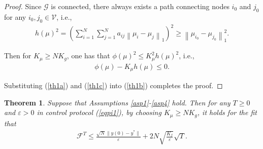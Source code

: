 \documentclass[letterpaper, 10 pt, conference]{ieeeconf}  %
\newtheorem{theorem}{ {Theorem}}
\begin{document}
\begin{proof}
	Since $\mathcal{G}$ is connected,  there always exists a path connecting nodes $i_0$ and $j_0$ for any $i_0,j_0\in\mathcal{V}$, i.e.,
	\begin{align}
		h(\mu)^2=\left(\sum_{i=1}^N\sum_{j=1}^Na_{ij}\left\|\mu_i-\mu_j\right\|_1\right)^2\ge \left\|\mu_{i_0}-\mu_{j_0}\right\|_1^2.
	\end{align}
	
	Then for $K_\mu \ge NK_g$, one has that
	$\phi(\mu)^2\le K_\mu^2 h(\mu)^2$,
	i.e.,
	\begin{align}
		\phi(\mu)-K_\mu h(\mu)\le 0.\label{th1c}
	\end{align}

	
	Substituting (\ref{th1a}) and (\ref{th1c}) into (\ref{th1b}) completes the proof.
	
\end{proof}

\begin{theorem}\label{th2}	
	Suppose that Assumptions \ref{asp1}-\ref{asp4} hold. Then for any $T\ge0$ and $\varepsilon>0$ in control protocol (\ref{eqpi1}), by choosing $K_\mu \ge NK_g$, it holds for the fit that
	\begin{align}
		\mathcal{F}^T\le \frac{\sqrt{N}\|y(0)-y^*\|}{\varepsilon}  +  2N\sqrt{\frac{K_f}{\varepsilon}}\sqrt{T}.
	\end{align}
	
\end{theorem}
\end{document}
